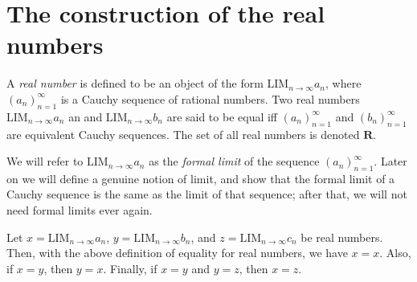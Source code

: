 \section{The construction of the real numbers}\label{sec 5.3}

\begin{definition}\label{5.3.1}
    A \emph{real number} is defined to be an object of the form \(\text{LIM}_{n \to \infty} a_n\), where \((a_n)_{n = 1}^{\infty}\) is a Cauchy sequence of rational numbers.
    Two real numbers \(\text{LIM}_{n \to \infty} a_n\) an and \(\text{LIM}_{n \to \infty} b_n\) are said to be equal iff \((a_n)_{n = 1}^{\infty}\) and \((b_n)_{n = 1}^{\infty}\) are equivalent Cauchy sequences.
    The set of all real numbers is denoted \(\mathbf{R}\).
\end{definition}

\begin{note}
    We will refer to \(\text{LIM}_{n \to \infty} a_n\) as the \emph{formal limit} of the sequence \((a_n)_{n = 1}^{\infty}\).
    Later on we will define a genuine notion of limit, and show that the formal limit of a Cauchy sequence is the same as the limit of that sequence;
    after that, we will not need formal limits ever again.
\end{note}

\setcounter{theorem}{2}
\begin{proposition}\label{5.3.3}
    Let \(x = \text{LIM}_{n \to \infty} a_n\), \(y = \text{LIM}_{n \to \infty} b_n\), and \(z = \text{LIM}_{n \to \infty} c_n\) be real numbers.
    Then, with the above definition of equality for real numbers, we have \(x = x\).
    Also, if \(x = y\), then \(y = x\).
    Finally, if \(x = y\) and \(y = z\), then \(x = z\).
\end{proposition}

